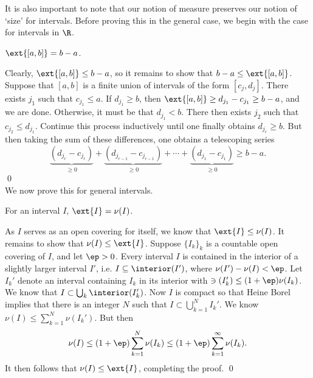 It is also important to note that our notion of measure preserves our notion of `size' for intervals. Before proving this in the general case, we begin with the case for intervals in $\R$.

\begin{prop}
$\ext{[a,b]}= b-a$. 
\end{prop}

\pf Clearly, $\ext{[a,b]} \leq b-a$, so it remains to show that $b-a \leq \ext{[a,b]}$. Suppose that $[a,b]$ is a finite union of intervals of the form $[c_j,d_j]$. There exists $j_1$ such that $c_{j_1} \leq a$. If $d_{j_1} \geq b$, then $\ext{[a,b]} \geq d_{j_1} - c_{j_1} \geq b-a$, and we are done. Otherwise, it must be that $d_{j_1} < b$. There then exists $j_2$ such that $c_{j_2} \leq d_{j_1}$. Continue this process inductively until one finally obtains $d_{j_r} \geq b$. But then taking the sum of these differences, one obtains a telescoping series
	\[
	\underbrace{(d_{j_{r}} - c_{j_{r}})}_{\geq 0} + \underbrace{(d_{j_{r-1}} - c_{j_{r-1}})}_{\geq 0} + \cdots + \underbrace{(d_{j_{1}} - c_{j_{1}})}_{\geq 0} \geq b-a.
	\]
\qed \\


\noindent We now prove this for general intervals.


\begin{prop} \label{prop:openintmeasure}
For an interval $I$, $\ext{I}= \nu(I)$.
\end{prop}

\pf As $I$ serves as an open covering for itself, we know that $\ext{I} \leq \nu(I)$. It remains to show that $\nu(I) \leq \ext{I}$. Suppose $\{I_k\}_k$ is a countable open covering of $I$, and let $\ep>0$. Every interval $I$ is contained in the interior of a slightly larger interval $I'$, i.e. $I \subseteq \interior(I')$, where $\nu(I')  - \nu(I)<\ep$. Let $I_k'$ denote an interval containing $I_k$ in its interior with $\ni(I_k') \leq (1+\ep)\nu(I_k)$. We know that $I \subset \bigcup_k \interior(I_k')$. Now $I$ is compact so that Heine Borel implies that there is an integer $N$ such that $I \subset \bigcup_{k=1}^N I_k'$. We know $\nu(I) \leq \sum_{k=1}^N \nu(I_k')$. But then
	\[
	\nu(I) \leq (1+\ep) \sum_{k=1}^N \nu(I_k) \leq (1+\ep) \sum_{k=1}^\infty \nu(I_k).
	\]
It then follows that $\nu(I) \leq \ext{I}$, completing the proof. \qed \\

